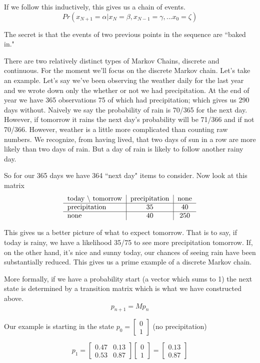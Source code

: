 \documentclass{article}
\theoremstyle{definition}
\theoremstyle{remark}
\begin{document}
If we follow this inductively, this gives us a chain of events.
\[
Pr(x_{N+1} =  \alpha | x_N = \beta, x_{N-1} = \gamma, ... x_0 = \zeta)
\]

The secret is that the events of two previous points in the sequence are ``baked in."

There are two relatively distinct types of Markov Chains, discrete and continuous.  For the moment we'll focus on the discrete Markov chain.  Let's take an example.  Let's say we've been observing the weather daily for the last year and we wrote down only the whether or not we had precipitation.
At the end of year we have 365 observations 75 of which had precipitation; which gives us 290 days without.  Naively we say the probability of rain is 70/365 for the next day.  However, if tomorrow it rains the next day's probability will be 71/366 and if not 70/366.  However, weather is a little more complicated than counting raw numbers.  We recognize, from having lived, that two days of sun in a row are more likely than two days of rain.  But a day of rain is likely to follow another rainy day.

So for our 365 days we have 364 ``next day" items to consider.  Now look at this matrix
\[
\begin{tabular}{l | c | c}
today $\backslash$ tomorrow & precipitation & none \\
\hline
precipitation    &    35         &   40 \\
\hline
none             &    40         &   250
\end{tabular}
\]  

This gives us a better picture of what to expect tomorrow.  That is to say, if today is rainy, we have a likelihood 35/75 to see more precipitation tomorrow.  If, on the other hand, it's nice and sunny today, our chances of seeing rain have been substantially reduced.  This gives us a prime example of a discrete Markov chain.

More formally, if we have a probability start (a vector which sums to 1) the next state is determined by a transition matrix which is what we have constructed above.
\[
p_{n+1} = M p_{n}
\]

Our example is starting in the state $p_0 = \begin{bmatrix}
0\\1
\end{bmatrix}$ (no precipitation)

\[
p_1 = \begin{bmatrix} 0.47 & 0.13\\
0.53 & 0.87\end{bmatrix} \begin{bmatrix}
0\\1
\end{bmatrix} = \begin{bmatrix}
0.13 \\ 0.87
\end{bmatrix}
\]
\end{document}
